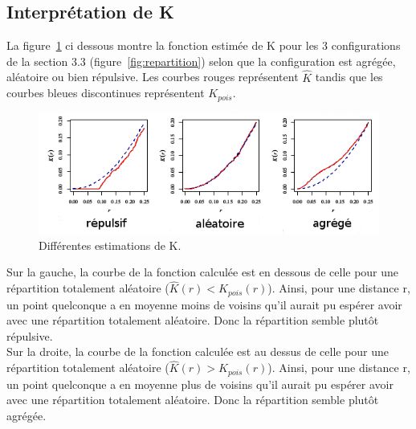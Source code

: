 \documentclass[stage2a]{tnreport}
\begin{document}

\vspace{0.5cm}
\subsection{Interprétation de K}
La figure~\ref{fig:interpretK} ci dessous montre la fonction estimée de K pour les 3 configurations de la section 3.3 (figure~\ref{fig:repartition}) selon que la configuration est agrégée, aléatoire ou bien répulsive. Les courbes rouges représentent \begin{math}\hat{K}\end{math} tandis que les courbes bleues discontinues représentent \begin{math}K_{pois}\end{math}.\\

\begin{figure}[h]
  \centering
  \includegraphics[scale=0.7]{figures/interpretK2.png}
  \caption{Différentes estimations de K.}
  \label{fig:interpretK}
\end{figure}


Sur la gauche, la courbe de la fonction calculée est en dessous de celle pour une répartition totalement aléatoire (\begin{math}\hat{K}(r) < K_{pois}(r) \end{math}). Ainsi, pour une distance r, un point quelconque a en moyenne moins de voisins qu'il aurait pu espérer avoir avec une répartition totalement aléatoire. Donc la répartition semble plutôt répulsive.\\
\indent
Sur la droite, la courbe de la fonction calculée est au dessus de celle pour une répartition totalement aléatoire (\begin{math}\hat{K}(r) > K_{pois}(r) \end{math}). Ainsi, pour une distance r, un point quelconque a en moyenne plus de voisins qu'il aurait pu espérer avoir avec une répartition totalement aléatoire. Donc la répartition semble plutôt agrégée.\\
\end{document}
